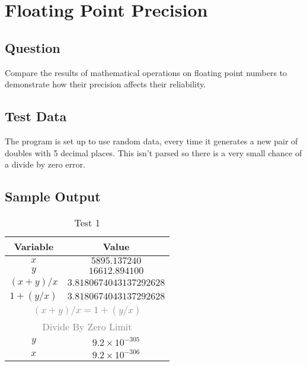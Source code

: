 \documentclass[main.tex]{subfiles}
\begin{document}
    \section{Floating Point Precision}
        \subsection{Question}
            Compare the results of mathematical operations on floating point numbers
            to demonstrate how their precision affects their reliability.

        \subsection{Test Data}
            The program is set up to use random data, every time it generates a new pair of doubles
            with 5 decimal places. This isn't parsed so there is a very small chance of a divide by zero error.\\
        
        \subsection{Sample Output}
            \begin{table}[H]
                \centering
                \begin{tabular}{c c}
                    \hline
                    \textbf{Variable} & \textbf{Value} \\
                    \hline
                    \(x\) & \(5895.137240\) \\
                    \(y\) & \(16612.894100\) \\
                    \hline
                    \hline
                    \((x + y) / x\) & \(3.8180674043137292628\) \\
                    \(1 + (y / x)\) & \(3.8180674043137292628\) \\
                    \multicolumn{2}{c}{\textcolor{gray}{\((x + y) / x = 1 + ( y / x)\)}} \\
                    \hline
                    \hline
                    \multicolumn{2}{c}{\textcolor{gray}{Divide By Zero Limit}} \\
                    \(y\) & \(9.2 \times 10^{-305}\) \\
                    \(x\) & \(9.2 \times 10^{-306}\) \\
                    \hline
                \end{tabular}
                \caption{Test 1}
            \end{table}
\end{document}
